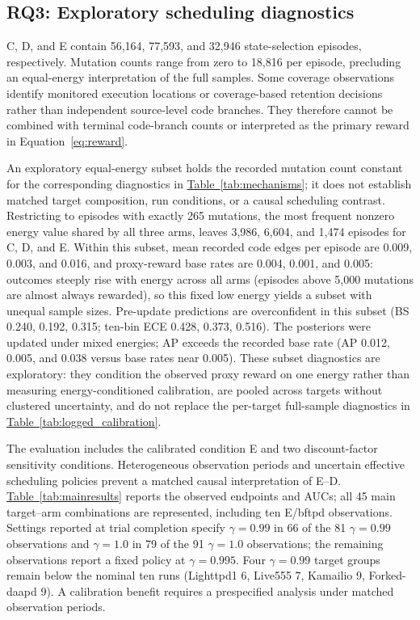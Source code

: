 \documentclass[final,5p,times,number]{elsarticle}
\newcommand{\namedref}[2]{\hyperref[#2]{#1~\ref*{#2}}}
\begin{document}
\subsection{RQ3: Exploratory scheduling diagnostics}
C, D, and E contain 56,164, 77,593, and 32,946 state-selection episodes, respectively. Mutation counts range from zero to 18,816 per episode, precluding an equal-energy interpretation of the full samples. Some coverage observations identify monitored execution locations or coverage-based retention decisions rather than independent source-level code branches. They therefore cannot be combined with terminal code-branch counts or interpreted as the primary reward in Equation~\ref{eq:reward}.

An exploratory equal-energy subset holds the recorded mutation count constant for the corresponding diagnostics in \namedref{Table}{tab:mechanisms}; it does not establish matched target composition, run conditions, or a causal scheduling contrast. Restricting to episodes with exactly 265 mutations, the most frequent nonzero energy value shared by all three arms, leaves 3,986, 6,604, and 1,474 episodes for C, D, and E. Within this subset, mean recorded code edges per episode are 0.009, 0.003, and 0.016, and proxy-reward base rates are 0.004, 0.001, and 0.005: outcomes steeply rise with energy across all arms (episodes above 5,000 mutations are almost always rewarded), so this fixed low energy yields a subset with unequal sample sizes. Pre-update predictions are overconfident in this subset (BS 0.240, 0.192, 0.315; ten-bin ECE 0.428, 0.373, 0.516). The posteriors were updated under mixed energies; AP exceeds the recorded base rate (AP 0.012, 0.005, and 0.038 versus base rates near 0.005). These subset diagnostics are exploratory: they condition the observed proxy reward on one energy rather than measuring energy-conditioned calibration, are pooled across targets without clustered uncertainty, and do not replace the per-target full-sample diagnostics in \namedref{Table}{tab:logged_calibration}.

The evaluation includes the calibrated condition E and two discount-factor sensitivity conditions. Heterogeneous observation periods and uncertain effective scheduling policies prevent a matched causal interpretation of E--D. \namedref{Table}{tab:mainresults} reports the observed endpoints and AUCs; all 45 main target--arm combinations are represented, including ten E/bftpd observations. Settings reported at trial completion specify $\gamma=0.99$ in 66 of the 81 $\gamma=0.99$ observations and $\gamma=1.0$ in 79 of the 91 $\gamma=1.0$ observations; the remaining observations report a fixed policy at $\gamma=0.995$. Four $\gamma=0.99$ target groups remain below the nominal ten runs (Lighttpd1 6, Live555 7, Kamailio 9, Forked-daapd 9). A calibration benefit requires a prespecified analysis under matched observation periods.
\end{document}
